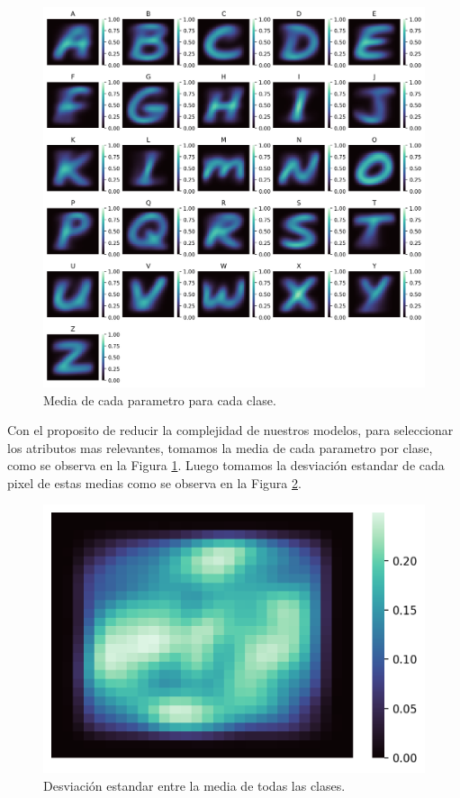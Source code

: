 \documentclass[11pt,a4paper, twocolumn]{article}
\begin{document}
\begin{figure}[H]
	\centering
	\includegraphics[scale=0.5]{figuras/1a.png}
	\caption{Media de cada parametro para cada clase.}
	\label{fig:1a}
\end{figure}

Con el proposito de reducir la complejidad de nuestros modelos, para seleccionar los atributos mas relevantes, tomamos la media de cada parametro por clase, como se observa en la Figura \ref{fig:1a}. Luego tomamos la desviación estandar de cada pixel de estas medias como se observa en la Figura \ref{fig:2a}.

\begin{figure}[H]

	\centering
	\includegraphics[scale=0.8]{figuras/2a.png}
	\caption{Desviación estandar entre la media de todas las clases.}
	\label{fig:2a}
\end{figure}
\end{document}

